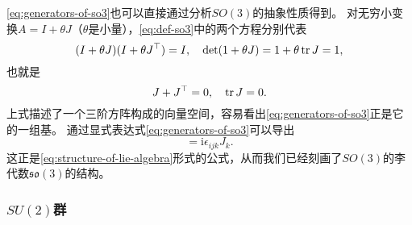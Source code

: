 \documentclass[hyperref, UTF8, a4paper]{ctexart}
\newcommand*{\ii}{\mathrm{i}}
\begin{document}
\eqref{eq:generators-of-so3}也可以直接通过分析$SO(3)$的抽象性质得到。
对无穷小变换$A = I + \theta J$（$\theta$是小量），\eqref{eq:def-so3}中的两个方程分别代表
\[
    (I+\theta J) (I + \theta J^\top) = I, \quad \det (1 + \theta J) = 1 + \theta \trace J = 1,
\]
也就是
\[
    J + J^\top = 0, \quad \trace J = 0.
\]
上式描述了一个三阶方阵构成的向量空间，容易看出\eqref{eq:generators-of-so3}正是它的一组基。
通过显式表达式\eqref{eq:generators-of-so3}可以导出
\begin{equation}
    [J_i, J_j] = \ii \epsilon_{ijk} J_k.
    \label{eq:lie-algebra-so3}
\end{equation}
这正是\eqref{eq:structure-of-lie-algebra}形式的公式，从而我们已经刻画了$SO(3)$的李代数$\mathfrak{so}(3)$的结构。

\subsubsection{$SU(2)$群}
\end{document}
